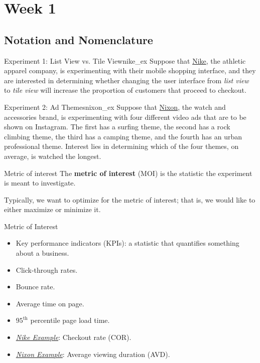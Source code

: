 \chapter{Week 1}
\section{Notation and Nomenclature}
\begin{Example}{Experiment 1: List View vs. Tile View}{nike_ex}
    Suppose that \href{https://www.nike.com/ca/}{Nike}, the athletic apparel company,
    is experimenting with their mobile shopping interface, and they are interested in determining
    whether changing the user interface from \emph{list view}
    to \emph{tile view} will increase the proportion
    of customers that proceed to checkout.
\end{Example}
\begin{Example}{Experiment 2: Ad Themes}{nixon_ex}
    Suppose that \href{https://www.nixon.com/ca/en}{Nixon},
    the watch and accessories brand, is experimenting
    with four different video ads that are to be shown on Instagram.
    The first has a surfing theme, the second has a rock climbing theme, the third
    has a camping theme, and the fourth has an urban professional theme.
    Interest lies in determining which of the four themes, on average,
    is watched the longest.
\end{Example}
\begin{Definition}{Metric of interest}{}
    The \textbf{metric of interest} (MOI) is the statistic the experiment is
    meant to investigate.
\end{Definition}
\begin{Remark}{}{}
    Typically, we want to optimize for the metric of interest; that is,
    we would like to either maximize or minimize it.
\end{Remark}
\begin{Example}{Metric of Interest}{}
    \begin{itemize}
        \item Key performance indicators (KPIs): a statistic that
              quantifies something about a business.
        \item Click-through rates.
        \item Bounce rate.
        \item Average time on page.
        \item $ 95^{\text{th}} $ percentile page load time.
        \item \emph{\hyperref[ex:nike_ex]{Nike Example}}: Checkout rate (COR).
        \item \emph{\hyperref[ex:nixon_ex]{Nixon Example}}: Average viewing duration (AVD).
    \end{itemize}
\end{Example}
